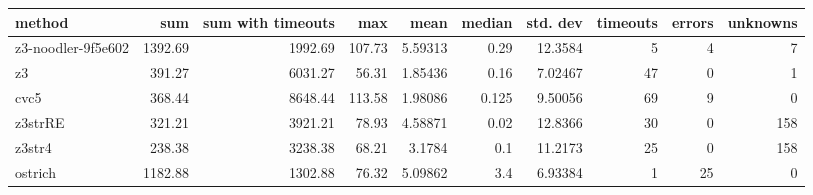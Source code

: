\begin{tabular}{lrrrrrrrrr}
\hline
 method             &     sum &   sum with timeouts &    max &    mean &   median &   std. dev &   timeouts &   errors &   unknowns \\
\hline
 z3-noodler-9f5e602 & 1392.69 &             1992.69 & 107.73 & 5.59313 &    0.29  &   12.3584  &          5 &        4 &          7 \\
 z3                 &  391.27 &             6031.27 &  56.31 & 1.85436 &    0.16  &    7.02467 &         47 &        0 &          1 \\
 cvc5               &  368.44 &             8648.44 & 113.58 & 1.98086 &    0.125 &    9.50056 &         69 &        9 &          0 \\
 z3strRE            &  321.21 &             3921.21 &  78.93 & 4.58871 &    0.02  &   12.8366  &         30 &        0 &        158 \\
 z3str4             &  238.38 &             3238.38 &  68.21 & 3.1784  &    0.1   &   11.2173  &         25 &        0 &        158 \\
 ostrich            & 1182.88 &             1302.88 &  76.32 & 5.09862 &    3.4   &    6.93384 &          1 &       25 &          0 \\
\hline
\end{tabular}

